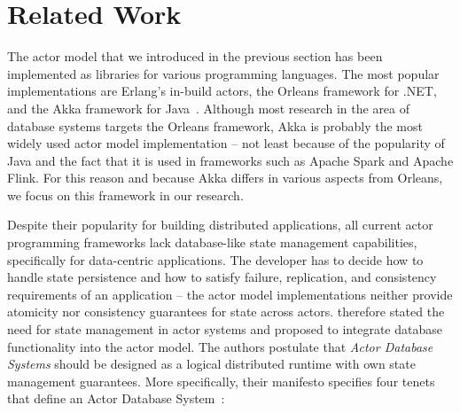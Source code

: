 
\section{Related Work}\label{sec:related_work}

  The actor model that we introduced in the previous section has been implemented as libraries for various programming languages. 
  The most popular implementations are Erlang's in-build actors, the Orleans framework for .NET, and the Akka framework for Java~\cite{armstrong:erlang,akka,bernstein:orleans}.
  Although most research in the area of database systems targets the Orleans framework, Akka is probably the most widely used actor model implementation -- not least because of the popularity of Java and the fact that it is used in frameworks such as Apache Spark and Apache Flink.
  For this reason and because Akka differs in various aspects from Orleans, we focus on this framework in our research.
  

  Despite their popularity for building distributed applications, all current actor programming frameworks lack database-like state management capabilities, specifically for data-centric applications.
  The developer has to decide how to handle state persistence and how to satisfy failure, replication, and consistency requirements of an application -- the actor model implementations neither provide atomicity nor consistency guarantees for state across actors.
   therefore stated the need for state management in actor systems and proposed to integrate database functionality into the actor model.
  The authors postulate that \textit{Actor Database Systems} should be designed as a logical distributed runtime with own state management guarantees.
  More specifically, their manifesto specifies four tenets that define an Actor Database System~\cite{manifesto}:

